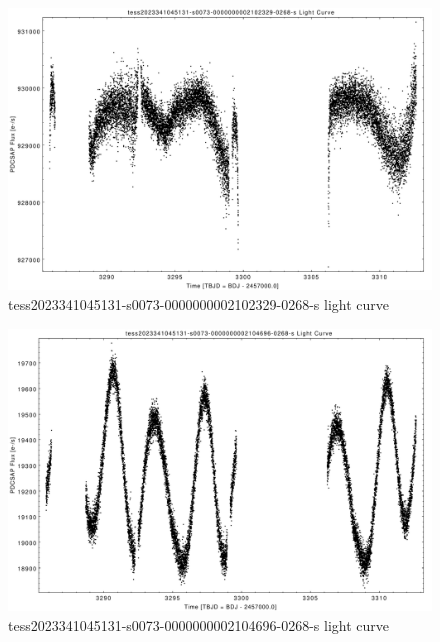 \documentclass[a4paper,12pt]{article}
\begin{document}
\begin{figure}[htbp]
    \centering
    \includegraphics[width = 1\textwidth]{
      lightcurves/tess2023341045131-s0073-0000000002102329-0268-s.pdf}
    \caption{tess2023341045131-s0073-0000000002102329-0268-s light curve}
\end{figure}
\begin{figure}[htbp]
    \centering
    \includegraphics[width = 1\textwidth]{
      lightcurves/tess2023341045131-s0073-0000000002104696-0268-s.pdf}
    \caption{tess2023341045131-s0073-0000000002104696-0268-s light curve}
\end{figure}
\end{document}
